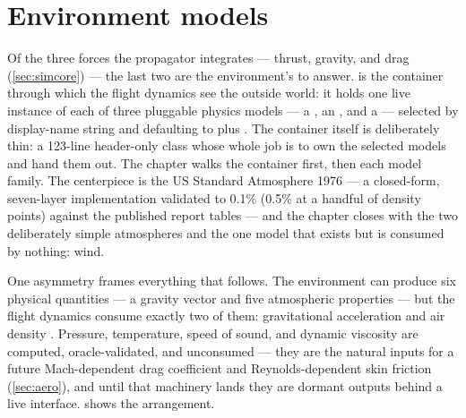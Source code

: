 \section{Environment models}\label{sec:environment}

Of the three forces the propagator integrates --- thrust, gravity, and drag
(\cref{sec:simcore}) --- the last two are the environment's to answer.
 is the container through which the flight dynamics see the outside
world: it holds one live instance of each of three pluggable physics models --- a
, an , and a 
 --- selected by display-name string and defaulting to
 plus  . The
container itself is deliberately thin: a 123-line header-only class
 whose whole job is to own the selected models and hand them out.
The chapter walks the container first, then each model family. The centerpiece is the US
Standard Atmosphere 1976 --- a closed-form, seven-layer implementation validated to 0.1\%
(0.5\% at a handful of density points) against the published report tables --- and the
chapter closes with the two deliberately
simple atmospheres and the one model that exists but is consumed by nothing: wind.

One asymmetry frames everything that follows. The environment can produce six physical
quantities --- a gravity vector and five atmospheric properties --- but the flight dynamics
consume exactly two of them: gravitational acceleration  and
air density . Pressure, temperature, speed of sound, and
dynamic viscosity are computed, oracle-validated, and unconsumed --- they are the natural
inputs for a future Mach-dependent drag coefficient and Reynolds-dependent skin friction
(\cref{sec:aero}), and until that machinery lands they are dormant outputs behind a live
interface.  shows the arrangement.


